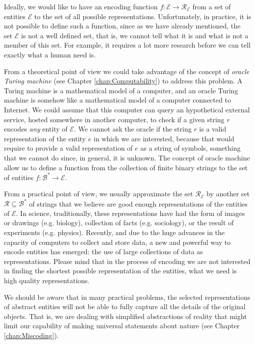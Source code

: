 Ideally, we would like to have an encoding function $f:\mathcal{E} \rightarrow \mathcal{R_\mathcal{E}}$ from a set of entities $\mathcal{E}$ to the set of all possible representations. Unfortunately, in practice, it is not possible to define such a function, since as we have already mentioned, the set $\mathcal{E}$ is not a well defined set, that is, we cannot tell what it is and what is not a member of this set. For example, it requires a lot more research before we can tell exactly what a human need is.

From a theoretical point of view we could take advantage of the concept of \emph{oracle Turing machine} (see Chapter \ref{chap:Computability}) to address this problem. A Turing machine is a mathematical model of a computer, and an oracle Turing machine is somehow like a mathematical model of a computer connected to Internet. We could assume that this computer can query an hypothetical external service, hosted somewhere in another computer, to check if a given string $r$ encodes \emph{any} entity of $\mathcal{E}$. We cannot ask the oracle if the string $r$ is a valid representation of the entity $e$ in which we are interested, because that would require to provide a valid representation of $e$ as a string of symbols, something that we cannot do since, in general, it is unknown. The concept of oracle machine allow us to define a function from the collection of finite binary strings to the set of entities $f:\mathcal{B}^\ast \rightarrow \mathcal{E}$.

From a practical point of view, we usually approximate the set $\mathcal{R}_\mathcal{E}$ by another set $\mathcal{R} \subseteq \mathcal{B}^\ast$ of strings that we believe are good enough representations of the entities of $\mathcal{E}$. In science, traditionally, these representations have had the form of images or drawings (e.g. biology), collection of facts (e.g. sociology), or the result of experiments (e.g. physics). Recently, and due to the huge advances in the capacity of computers to collect and store data, a new and powerful way to encode entities has emerged: the use of large collections of data as representations. Please mind that in the process of encoding we are not interested in finding the shortest possible representation of the entities, what we need is high quality representations.

We should be aware that in many practical problems, the selected representations of abstract entities will not be able to fully capture all the details of the original objects. That is, we are dealing with simplified abstractions of reality that might limit our capability of making universal statements about nature (see Chapter \ref{chap:Miscoding}).

